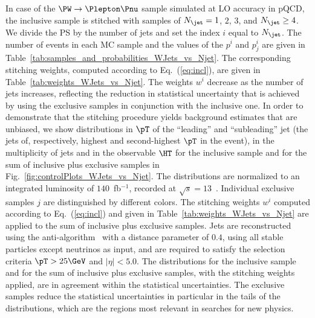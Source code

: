 In case of the $\PW \to \Plepton\Pnu$ sample simulated at LO accuracy in pQCD,
the inclusive sample is stitched with samples of $N_{\jet} = 1$, $2$, $3$, and $N_{\jet} \geq 4$.
We divide the PS by the number of jets and set the index $i$ equal to $N_{\jet}$.
The number of events in each MC sample and the values of the $p^{i}$ and $p_{j}^{i}$ are given in Table~\ref{tab:samples_and_probabilities_WJets_vs_Njet}.
The corresponding stitching weights, computed according to Eq.~(\ref{eq:incl}), are given in Table~\ref{tab:weights_WJets_vs_Njet}.
The weights $w^{i}$ decrease as the number of jets increases, 
reflecting the reduction in statistical uncertainty that is achieved by using the exclusive samples in conjunction with the inclusive one.
In order to demonstrate that the stitching procedure yields background estimates that are unbiased,
we show distributions in $\pT$ of the ``leading'' and ``subleading'' jet (the jets of, respectively, highest and second-highest $\pT$ in the event),
in the multiplicity of jets and in the observable $\HT$ 
for the inclusive sample and for the sum of inclusive plus exclusive samples in Fig.~\ref{fig:controlPlots_WJets_vs_Njet}.
The distributions are normalized to an integrated luminosity of $140$~fb$^{-1}$, recorded at $\sqrt{s}=13$~\TeV.
Individual exclusive samples $j$ are distinguished by different colors.
The stitching weights $w^{i}$ computed according to Eq.~(\ref{eq:incl}) and given in Table~\ref{tab:weights_WJets_vs_Njet} are applied to the sum of inclusive plus exclusive samples.
Jets are reconstructed using the anti-\kt algorithm~\cite{Cacciari:2008gp,Cacciari:2011ma} with a distance parameter of $0.4$,
using all stable particles except neutrinos as input, and are required to satisfy the selection criteria $\pT > 25\GeV$ and $\vert\eta\vert < 5.0$.
The distributions for the inclusive sample and for the sum of inclusive plus exclusive samples, with the stitching weights applied, are in agreement within the statistical uncertainties.
The exclusive samples reduce the statistical uncertainties in particular in the tails of the distributions,
which are the regions most relevant in searches for new physics.

